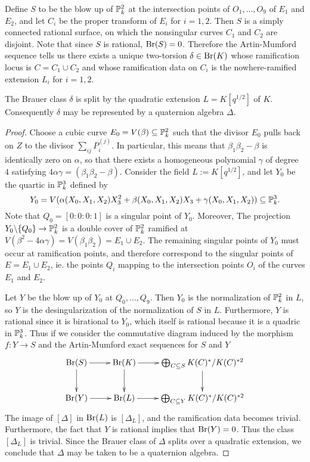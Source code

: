 Define $S$ to be the blow up of $\mathbb{P}_k^2$ at the intersection points of $O_1,\dots,O_9$ of $E_1$ and $E_2$, and let $C_i$ be the proper transform of $E_i$ for $i=1,2$.  Then $S$ is a simply connected rational surface, on which the nonsingular curves $C_1$ and $C_2$ are disjoint.  Note that since $S$ is rational, $\textnormal{Br}(S) = 0$.  Therefore the Artin-Mumford sequence tells us there exists a unique two-torsion $\delta\in\textnormal{Br}(K)$ whose ramification locus is $C = C_1\cup C_2$ and whose ramification data on $C_i$ is the nowhere-ramified extension $L_i$ for $i=1,2$.
\begin{lem}
The Brauer class $\delta$ is split by the quadratic extension $L = K[q^{1/2}]$ of $K$.  Consequently $\delta$ may be represented by a quaternion algebra $\Delta$.
\end{lem}
\begin{proof}
Choose a cubic curve $E_0 = V(\beta)\subseteq \mathbb{P}^2_k$ such that the divisor $E_0$ pulls back on $Z$ to the divisor $\sum_{ij}P_i^{(j)}$.  In particular, this means that $\beta_1\beta_2-\beta$ is identically zero on $\alpha$, so that there exists a homogeneous polynomial $\gamma$ of degree $4$ satisfying $4\alpha\gamma = (\beta_1\beta_2-\beta)$.  Consider the field $L := K[q^{1/2}]$, and let $Y_0$ be the quartic in $\mathbb{P}^3_k$ defined by
$$Y_0 = V(\alpha(X_0,X_1,X_2)X_3^2 + \beta(X_0,X_1,X_2)X_3 + \gamma(X_0,X_1,X_2))\subseteq \mathbb{P}^3_k.$$
Note that $Q_0 = [0:0:0:1]$ is a singular point of $Y_0$.  Moreover, The projection $Y_0\backslash\{Q_0\}\rightarrow\mathbb{P}^2_k$ is a double cover of $\mathbb{P}^2_k$ ramified at $V(\beta^2-4\alpha\gamma) = V(\beta_1\beta_2) = E_1\cup E_2$.  The remaining singular points of $Y_0$ must occur at ramification points, and therefore correspond to the singular points of $E = E_1\cup E_2$, ie. the points $Q_i$ mapping to the intersection points $O_i$ of the curves $E_1$ and $E_2$.

Let $Y$ be the blow up of $Y_0$ at $Q_0,\dots, Q_9$.  Then $Y_0$ is the normalization of $\mathbb{P}^2_k$ in $L$, so $Y$ is the desingularization of the normalization of $S$ in $L$.  Furthermore, $Y$ is rational since it is birational to $Y_0$, which itself is rational because it is a quadric in $\mathbb{P}^3_k$.  Thus if we consider the commutative diagram induced by the morphism $f: Y\rightarrow S$ and the Artin-Mumford exact sequences for $S$ and $Y$
$$\xymatrix{
\Br(S) \ar[r]\ar[d] & \Br(K) \ar[r]\ar[d] & \bigoplus_{C\subseteq S} K(C)^*/K(C)^{*2}\ar[d]\\
\Br(Y) \ar[r] & \Br(L) \ar[r] & \bigoplus_{C\subseteq Y} K(C)^*/K(C)^{*2}
}$$
The image of $[\Delta]$ in $\textnormal{Br}(L)$ is $[\Delta_L]$, and the ramification data becomes trivial.  Furthermore, the fact that $Y$ is rational implies that $\textnormal{Br}(Y) =0$.  Thus the class $[\Delta_L]$ is trivial.  Since the Brauer class of $\Delta$ splits over a quadratic extension, we conclude that $\Delta$ may be taken to be a quaternion algebra.
\end{proof}

